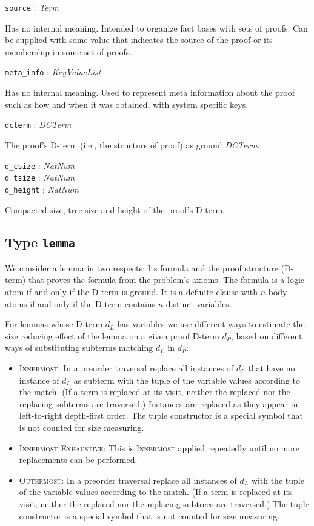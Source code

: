 \documentclass[a4paper,11pt]{article}
\newcommand{\f}[1]{\texttt{#1}}
\newcommand{\lit}[1]{\textnormal{\textit{#1}}}
\newcommand{\propsig}[2]
{\noindent \f{#1} : #2}
\newcommand{\propdesc}[1]
{\par \hspace*{\fill}\begin{minipage}{0.9\textwidth}#1\end{minipage}\par\smallskip}
\begin{document}
\propsig{source}{\lit{Term}}

\propdesc{Has no internal meaning. Intended to organize fact bases with sets of
  proofs. Can be supplied with some value that indicates the source of the
  proof or its membership in some set of proofs.}


\propsig{meta\_info}{\lit{KeyValueList}}

\propdesc{Has no internal meaning. Used to represent meta information about
  the proof such as how and when it was obtained, with system specific keys.}

\propsig{dcterm}{\lit{DCTerm}}

\propdesc{The proof's D-term (i.e., the structure of proof) as ground
  \lit{DCTerm}.}

\propsig{d\_csize}{\lit{NatNum}}\\
\propsig{d\_tsize}{\lit{NatNum}}\\
\propsig{d\_height}{\lit{NatNum}}

\propdesc{Compacted size, tree size and height of the proof's D-term.}

\subsection{Type \f{lemma}}                       

We consider a lemma in two respects: Its formula and the proof structure
(D-term) that proves the formula from the problem's axioms. The formula is a
logic atom if and only if the D-term is ground. It is a definite clause with
$n$ body atoms if and only if the D-term contains $n$ distinct variables.

For lemmas whose D-term $d_L$ has variables we use different ways to estimate
the size reducing effect of the lemma on a given proof D-term $d_P$, based on
different ways of substituting subterms matching $d_L$ in $d_P$:
\begin{itemize}

\item \textsc{Innermost}: In a preorder traversal replace all instances of
  $d_L$ that have no instance of $d_L$ as subterm with the tuple of the
  variable values according to the match. (If a term is replaced at its visit,
  neither the replaced nor the replacing subterms are traversed.) Instances
  are replaced as they appear in left-to-right depth-first order. The tuple
  constructor is a special symbol that is not counted for size measuring.

\item \textsc{Innermost Exhaustive}: This is \textsc{Innermost} applied
  repeatedly until no more replacements can be performed.
  
\item \textsc{Outermost}: In a preorder traversal replace all instances of
  $d_L$ with the tuple of the variable values according to the match. (If a
  term is replaced at its visit, neither the replaced nor the replacing
  subtrees are traversed.) The tuple constructor is a special symbol that is
  not counted for size measuring.
\end{itemize}
\end{document}

